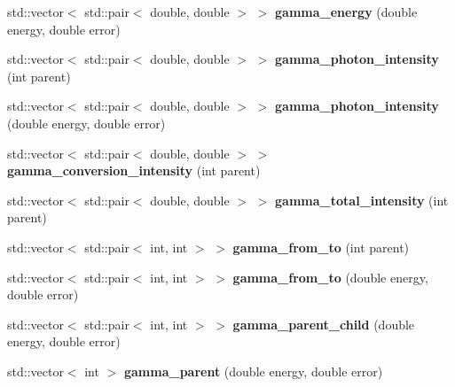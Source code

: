 \begin{DoxyCompactItemize}
\mbox{\label{namespacepyne_ae9c513347dbf555ae036671b9e606ff3}} 
std\+::vector$<$ std\+::pair$<$ double, double $>$ $>$ {\bfseries gamma\+\_\+energy} (double energy, double error)
\item 
\mbox{\label{namespacepyne_af6550cdd1953ef1b6765c756cb8dbd8a}} 
std\+::vector$<$ std\+::pair$<$ double, double $>$ $>$ {\bfseries gamma\+\_\+photon\+\_\+intensity} (int parent)
\item 
\mbox{\label{namespacepyne_aed619424ed24f8e57b0cd1adf5e3cd5e}} 
std\+::vector$<$ std\+::pair$<$ double, double $>$ $>$ {\bfseries gamma\+\_\+photon\+\_\+intensity} (double energy, double error)
\item 
\mbox{\label{namespacepyne_aecfb315cfddf396d32d23b0cc5cc1958}} 
std\+::vector$<$ std\+::pair$<$ double, double $>$ $>$ {\bfseries gamma\+\_\+conversion\+\_\+intensity} (int parent)
\item 
\mbox{\label{namespacepyne_af27fabc2e6cae361e977993a84c67ac2}} 
std\+::vector$<$ std\+::pair$<$ double, double $>$ $>$ {\bfseries gamma\+\_\+total\+\_\+intensity} (int parent)
\item 
\mbox{\label{namespacepyne_ab7c78ce8ef6b2242b1b91e4b044b75b1}} 
std\+::vector$<$ std\+::pair$<$ int, int $>$ $>$ {\bfseries gamma\+\_\+from\+\_\+to} (int parent)
\item 
\mbox{\label{namespacepyne_aadaed97b885de370c1a7361a39079021}} 
std\+::vector$<$ std\+::pair$<$ int, int $>$ $>$ {\bfseries gamma\+\_\+from\+\_\+to} (double energy, double error)
\item 
\mbox{\label{namespacepyne_ab57180e1e9e791ab2480cd4875f6330c}} 
std\+::vector$<$ std\+::pair$<$ int, int $>$ $>$ {\bfseries gamma\+\_\+parent\+\_\+child} (double energy, double error)
\item 
\mbox{\label{namespacepyne_a94e4481d01e0d9c2f3d34a11ccdd0e4f}} 
std\+::vector$<$ int $>$ {\bfseries gamma\+\_\+parent} (double energy, double error)
\item 
\mbox{\label{namespacepyne_acc6c4b51ec74e0bd3383d2724b16a8ef}} 

\end{DoxyCompactItemize}
